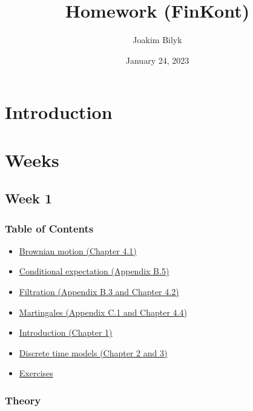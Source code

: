 \documentclass[
]{article}
\title{Homework (FinKont)}
\author{Joakim Bilyk}
\date{January 24, 2023\newpage}
\begin{document}
\maketitle

{
\setcounter{tocdepth}{5}
\tableofcontents
}
\thispagestyle{empty}
\newpage
\setcounter{page}{1}
\pagestyle{fancy}

\hypertarget{introduction}{%
\section{Introduction}\label{introduction}}

\hypertarget{weeks}{%
\section{Weeks}\label{weeks}}

\hypertarget{week-1}{%
\subsection{Week 1}\label{week-1}}

\hypertarget{table-of-contents}{%
\subsubsection{Table of Contents}\label{table-of-contents}}

\begin{itemize}
\item
  \protect\hyperlink{the-brownian-motion}{Brownian motion (Chapter 4.1)}
\item
  \protect\hyperlink{conditional-expectation}{Conditional expectation
  (Appendix B.5)}
\item
  \protect\hyperlink{filtrations}{Filtration (Appendix B.3 and Chapter
  4.2)}
\item
  \protect\hyperlink{martingales}{Martingales (Appendix C.1 and Chapter
  4.4)}
\item
  \protect\hyperlink{discrete-time-models}{Introduction (Chapter 1)}
\item
  \protect\hyperlink{discrete-time-models}{Discrete time models (Chapter
  2 and 3)}
\item
  \protect\hyperlink{exercises-week-1}{Exercises}
\end{itemize}

\hypertarget{theory}{%
\subsubsection{Theory}\label{theory}}
\end{document}
